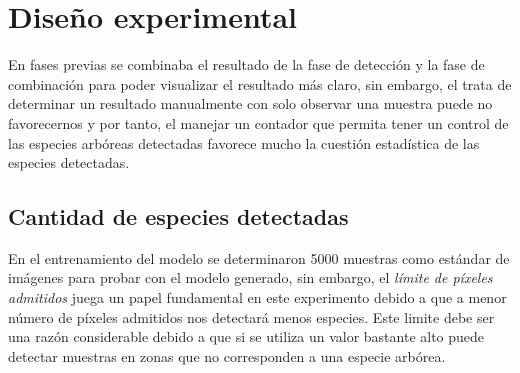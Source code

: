 \section{Diseño experimental}
En fases previas se combinaba el resultado de la fase de detección y la fase de combinación para poder visualizar el resultado más claro, sin embargo, el trata de determinar un resultado manualmente con solo observar una muestra puede no favorecernos y por tanto, el manejar un contador que permita tener un control de las especies arbóreas detectadas favorece mucho la cuestión estadística de las especies detectadas.

\subsection{Cantidad de especies detectadas}
En el entrenamiento del modelo se determinaron 5000 muestras como estándar de imágenes para probar con el modelo generado, sin embargo, el \emph{límite de píxeles admitidos} juega un papel fundamental en este experimento debido a que a menor número de píxeles admitidos nos detectará menos especies. Este limite debe ser una razón considerable debido a que si se utiliza un valor bastante alto puede detectar muestras en zonas que no corresponden a una especie arbórea. 


%
%

